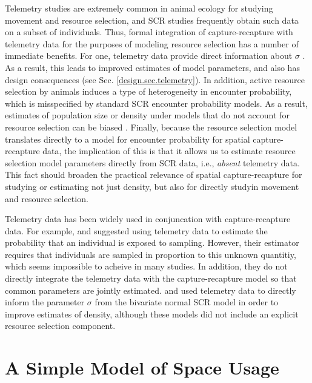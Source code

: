 Telemetry studies are extremely common in animal ecology for studying
movement and resource selection, and SCR studies frequently obtain
such data on a subset of individuals. Thus, formal integration of
capture-recapture with telemetry data for the purposes of modeling
resource selection has a number of immediate benefits. For one, 
 telemetry data provide direct information about $\sigma$
\citep{sollmann_etal:2012ecol,sollmann_etal:inprepjapplecol}. As a
result, this leads to improved estimates of model parameters, and also
has design consequences (see Sec. \ref{design.sec.telemetry}).  In
addition, active resource selection by animals induces a type of heterogeneity in
encounter probability, which is misspecified by standard SCR encounter
probability models. As a result, estimates of population size or
density under models that do not account for resource selection can be
biased \citep{royle_etal:2012mee}.  Finally, because the resource
selection model translates directly to a model for encounter
probability for spatial capture-recapture data, the implication of
this is that it allows us to estimate resource selection model
parameters directly from SCR data, i.e., {\it absent} telemetry
data. This fact should broaden the practical relevance of spatial
capture-recapture for studying or estimating not just density, but
also for directly studyin movement and resource selection.

Telemetry data has been widely 
used in conjuncation with capture-recapture data.  For
example, \citet{white_shenk:2001} and \citet{ivan:2012} suggested
using telemetry data to estimate the probability that an
individual is exposed to sampling. However, their estimator requires that
individuals are sampled in proportion to this unknown quantitiy, which
seems impossible to acheive in many studies. In addition, they do not
directly integrate the telemetry data with the capture-recapture model
so that common parameters are jointly estimated.
\citet{sollmann_etal:inprepjapplecol} and
\citet{sollmann_etal:2012ecol} used telemetry data to directly inform
the parameter $\sigma$ from the bivariate normal SCR model in order to
improve estimates of density, although these models did not include an
explicit resource selection component.







\section{A Simple Model of Space Usage}
\label{rsf.sec.rsfmodel}

